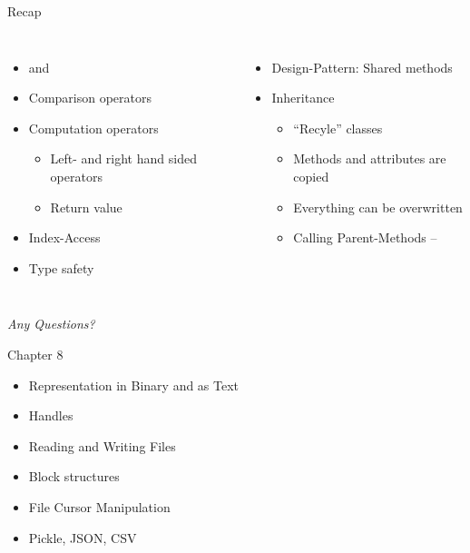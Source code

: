 
\begin{frame}[t,plain]
\titlepage
\end{frame}


\begin{frame}[fragile]{Recap}
%
\begin{columns}[T]
\begin{itemize}
\item {} and 
\item Comparison operators
\item Computation operators
	\begin{itemize}
	\item Left- and right hand sided operators
	\item Return value 
	\end{itemize}
\item Index-Access
\item Type safety
\end{itemize}
%
\begin{itemize}
\item Design-Pattern: Shared methods
\item Inheritance
	\begin{itemize}
	\item \enquote{Recyle} classes
	\item Methods and attributes are copied
	\item Everything can be overwritten
	\item Calling Parent-Methods -- 
	\end{itemize}
\end{itemize}

\end{columns}
%
\begin{center}
	\emph{Any Questions?}
\end{center}
%
\end{frame}


\begin{frame}[fragile]{Chapter 8}
%
\begin{itemize}
\item Representation in Binary and as Text
\item Handles
\item Reading and Writing Files
\item Block structures
\item File Cursor Manipulation
\item Pickle, JSON, CSV
\end{itemize}
%
\end{frame}

